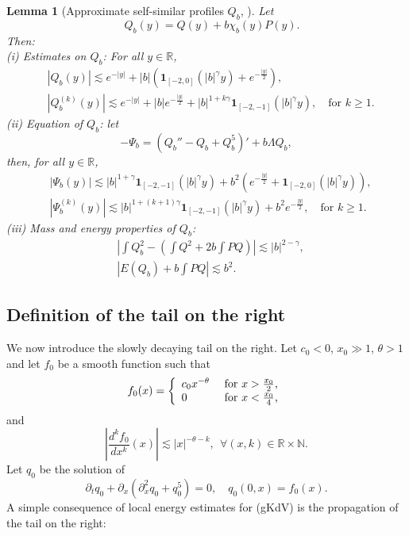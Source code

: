 \documentclass[11pt,a4paper,reqno]{amsart}
\newtheorem{lemma}[theorem]{Lemma}
\theoremstyle{remark}
\numberwithin{equation}{section}
\newcommand{\be}{\begin{equation}}
\newcommand{\ee}{\end{equation}}
\def\NN{\mathbb{N}}
\def\RR{\mathbb{R}}
\def\NN{\mathbb{N}}
\def\RR{\mathbb{R}}
\def\qz{q_0}
\begin{document}
\begin{lemma}[Approximate self-similar profiles $Q_b$, \cite{MMR1}]
\label{cl:2}
Let 
\begin{equation}\label{eq:210}
\quad 
Q_b(y) = Q(y) + b \chi_b(y)   P (y).
\end{equation}
Then:\\
{\rm (i) Estimates on $Q_b$:} For all $y \in \mathbb{R}$,
\begin{align}
&	|Q_b(y)|\lesssim  e^{-|y|} + |b| \left(  {\mathbf{1}}_{[-2,0]}(|b|^\gamma y) +  e^{-\frac {|y|}{2}} \right),
\label{eq:001}\\
&	|Q_b^{(k)}(y)|\lesssim  e^{-|y|} +   |b|  e^{-\frac {|y|}{2}} +|b|^{1+k \gamma} {\mathbf{1}}_{[-2,-1]}(|b|^\gamma y),\quad  \text{for $k\geq 1$}.
\label{eq:002}
\end{align}
\noindent
{\rm (ii) Equation of $Q_b$:} let
\begin{equation}\label{eq:201}
-\Psi_b=\left(Q_b''- Q_b+ Q_b^5\right)'+b {\Lambda} Q_b,
\end{equation}
then, for all $y\in \mathbb{R}$,
\begin{align}
& |\Psi_b(y)|\lesssim |b|^{1+ \gamma}  {\mathbf{1}}_{[-2 ,-1]}(|b|^{\gamma}y) 
+  b^2  \left(e^{-\frac {|y|} 2}+ {\mathbf{1}}_{[- 2,0]}(|b|^{\gamma}y) \right),\label{eq:202}
\\
& |\Psi_b^{(k)}(y)|\lesssim    |b|^{1+ (k+1) \gamma}  {\mathbf{1}}_{[-2 ,-1]}(|b|^{\gamma}y)  + b^2   e^{-\frac {|y|} 2} ,\quad 
 \text{for $k\geq 1$}. \label{eq:203}
\end{align}
{\rm (iii) Mass and energy properties of $Q_b$:}
\begin{align}
& \left|\int Q_b^2 - \left( \int Q^2 + 2b \int PQ \right)\right| \lesssim |b|^{2-\gamma}, \label{eq:204}\\
& \left| E(Q_b) + b \int PQ\right|\lesssim b^2 .
\label{eq:205}
\end{align}
\end{lemma}

\subsection{Definition of the tail on the right} We now introduce the slowly decaying tail on the right. Let $c_0<0$,  $x_0\gg 1$, $\theta>1$  and let
$f_0$ be a smooth function such that 
 \be\label{deffz}
f_0(x)=\left\{\begin{array}{ll}c_0 x^{-\theta} & \hbox{ for $x>\frac {x_0}2$},\\ 0 & \hbox{ for $x<\frac {x_0}4$,}\end{array}\right.
\ee
and 
\be\label{estfz}
\left|\frac {d^{k}f_0}{dx^k} (x)\right| \lesssim   |x|^{-\theta - k}, \ \ \forall (x,k)\in \RR\times \NN.
\ee
Let $\qz$ be the solution of 
\be\label{defqz}
\partial_t \qz + \partial_x(\partial_x^2 \qz + \qz^5)=0,\quad
\qz(0,x)= f_0(x).
\ee
A simple consequence of local energy estimates for (gKdV) is the propagation of the tail on the right:
\end{document}
